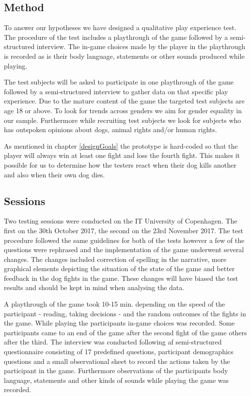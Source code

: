 \subsection{Method}
To answer our hypotheses we have designed a qualitative play experience test. The procedure of the test includes a playthrough of the game followed by a semi-structured interview. The in-game choices made by the player in the playthrough is recorded as is their body language, statements or other sounds produced while playing.

The test subjects will be asked to participate in one playthrough of the game followed by a semi-structured interview to gather data on that specific play experience. Due to the mature content of the game the targeted test subjects are age 18 or above. To look for trends across genders we aim for gender equality in our sample. Furthermore while recruiting test subjects we look for subjects who has outspoken opinions about dogs, animal rights and/or human rights.

As mentioned in chapter \ref{designGoals} the prototype is hard-coded so that the player will always win at least one fight and loss the fourth fight. This makes it possible for us to determine how the testers react when their dog kills another and also when their own dog dies.\

\subsection{Sessions}
Two testing sessions were conducted on the IT University of Copenhagen. The first on the 30th October 2017, the second on the 23rd November 2017. The test procedure followed the same guidelines for both of the tests however a few of the questions were rephrased and the implementation of the game underwent several changes. The changes included correction of spelling in the narrative, more graphical elements depicting the situation of the state of the game and better feedback in the dog fights in the game. These changes will have biased the test results and should be kept in mind when analysing the data.

A playthrough of the game took 10-15 min. depending on the speed of the participant - reading, taking decisions - and the random outcomes of the fights in the game. While playing the participants in-game choices was recorded. Some participants came to an end of the game after the second fight of the game others after the third.
The interview was conducted following af semi-structured questionnaire consisting of 17 predefined questions, participant demographics questions and a small observational sheet to record the actions taken by the participant in the game. Furthermore observations of the participants body language, statements and other kinds of sounds while playing the game was recorded.

